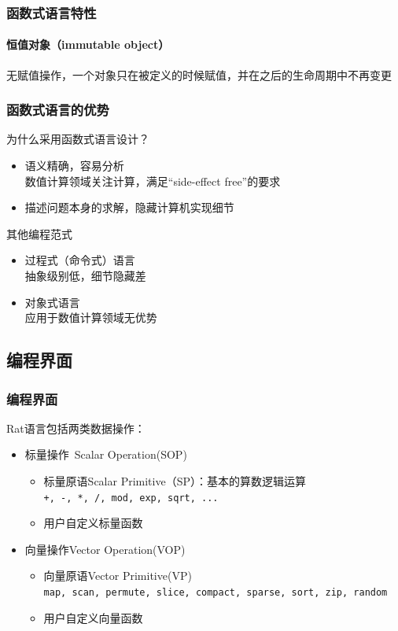 \documentclass{beamer}
\begin{document}
\begin{frame}
  \frametitle{函数式语言特性}
  \framesubtitle{恒值对象（immutable object）}
  无赋值操作，一个对象只在被定义的时候赋值，并在之后的生命周期中不再变更
  
\end{frame}

\begin{frame}
  \frametitle{函数式语言的优势}
  为什么采用函数式语言设计？
  \begin{itemize}
    \item 语义精确，容易分析\\
      数值计算领域关注计算，满足“side-effect free”的要求
    \item 描述问题本身的求解，隐藏计算机实现细节
  \end{itemize}
  \pause
  其他编程范式
  \begin{itemize}
    \item 过程式（命令式）语言\\
      抽象级别低，细节隐藏差
    \item 对象式语言\\
      应用于数值计算领域无优势
  \end{itemize}
\end{frame}

\subsection{编程界面}
\begin{frame}
  \frametitle{编程界面}
  Rat语言包括两类数据操作：
  \begin{itemize}
    \item<1-> 标量操作~Scalar Operation(SOP)
      \begin{itemize}
        \item 标量原语Scalar Primitive（SP）：基本的算数逻辑运算\\
          \texttt{+, -, *, /, mod, exp, sqrt, ...}
        \item 用户自定义标量函数
      \end{itemize}
    \item<2-> 向量操作Vector Operation(VOP)
      \begin{itemize}
        \item 向量原语Vector Primitive(VP)\\
          \texttt{map, scan, permute, slice, compact, sparse, sort, zip, random}
        \item 用户自定义向量函数
      \end{itemize}
  \end{itemize}
\end{frame}
\end{document}
